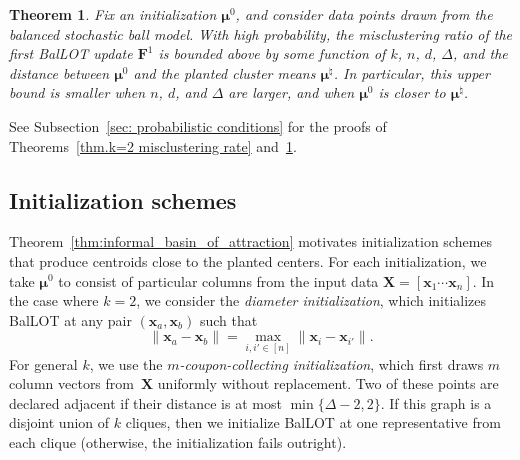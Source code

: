 \documentclass{article}
\theoremstyle{plain}
\newtheorem{theorem}{Theorem}
\theoremstyle{definition}
\newcommand{\1}{\mathbf{1}}
\newcommand{\hmu}{\bm{\mu}^\natural}
\newcommand{\bmF}{\bm{F}}
\newcommand{\bmu}{\bm{\mu}}
\begin{document}

\begin{theorem}
\label{thm:misclutering ratio}
Fix an initialization $\bmu^0$, and consider data points drawn from the balanced stochastic ball model.
With high probability, the misclustering ratio of the first BalLOT update $\bmF^1$ is bounded above by some function of  $k$, $n$, $d$, $\Delta$, and the distance between $\bmu^0$ and the planted cluster means $\hmu$. 
In particular, this upper bound is smaller when $n$, $d$, and $\Delta$ are larger, and when $\bmu^0$ is closer to $\hmu$.
\end{theorem}



See Subsection~\ref{sec: probabilistic conditions} for the proofs of Theorems~\ref{thm.k=2 misclustering rate} and~\ref{thm:misclutering ratio}.

\subsection{Initialization schemes}
\label{sec: initialization schemes}

Theorem~\ref{thm:informal_basin_of_attraction} motivates initialization schemes that produce centroids close to the planted centers.
For each initialization, we take $\bmu^0$ to consist of particular columns from the input data $\bm{X}=[\bm{x}_1\cdots\bm{x}_n]$.
In the case where $k=2$, we consider the \textit{diameter initialization}, which initializes BalLOT at any pair $(\bm{x}_a,\bm{x}_b)$ such that
\[
\|\bm{x}_a-\bm{x}_b\|
=
\max_{i,i'\in[n]}\|\bm{x}_i-\bm{x}_{i'}\|.
\]
For general $k$, we use the \textit{$m$-coupon-collecting initialization}, which first draws $m$ column vectors from~$\bm{X}$ uniformly without replacement.
Two of these points are declared adjacent if their distance is at most $\min\{\Delta-2,2\}$.
If this graph is a disjoint union of $k$ cliques, then we initialize BalLOT at one representative from each clique (otherwise, the initialization fails outright).
\end{document}

